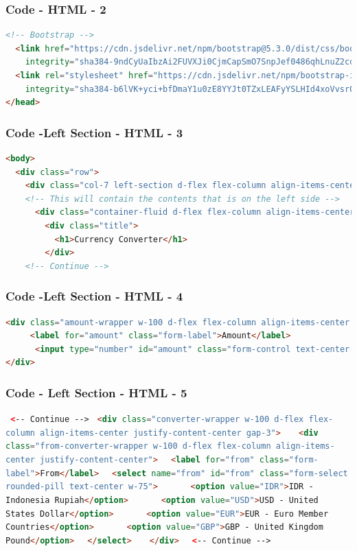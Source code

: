 \documentclass[aspectratio=169, table]{beamer}
\begin{document}
\begin{frame}[fragile]
    \frametitle{Code - HTML - 2}
    \vskip1cm
    \begin{lstlisting}[language=HTML]
  <!-- Bootstrap -->
  <link href="https://cdn.jsdelivr.net/npm/bootstrap@5.3.0/dist/css/bootstrap.min.css" rel="stylesheet"
    integrity="sha384-9ndCyUaIbzAi2FUVXJi0CjmCapSmO7SnpJef0486qhLnuZ2cdeRhO02iuK6FUUVM" crossorigin="anonymous" />
  <link rel="stylesheet" href="https://cdn.jsdelivr.net/npm/bootstrap-icons@1.10.2/font/bootstrap-icons.css"
    integrity="sha384-b6lVK+yci+bfDmaY1u0zE8YYJt0TZxLEAFyYSLHId4xoVvsrQu3INevFKo+Xir8e" crossorigin="anonymous" />
</head>
    \end{lstlisting}
\end{frame}

\begin{frame}[fragile]
    \frametitle{Code -Left Section - HTML - 3}
    \vskip1cm
    \begin{lstlisting}[language=HTML]
<body>
  <div class="row">
    <div class="col-7 left-section d-flex flex-column align-items-center justify-content-center">
	<!-- This will contain the contents that is on the left side -->
      <div class="container-fluid d-flex flex-column align-items-center justify-content-center gap-4">
        <div class="title">
          <h1>Currency Converter</h1>
        </div>
	<!-- Continue -->
    \end{lstlisting}
\end{frame}

\begin{frame}[fragile]
    \frametitle{Code -Left Section - HTML - 4}
    \vskip1cm
    \begin{lstlisting}[language=HTML]
<div class="amount-wrapper w-100 d-flex flex-column align-items-center justify-content-center">
     <label for="amount" class="form-label">Amount</label>
      <input type="number" id="amount" class="form-control text-center rounded-pill w-75" />
</div>
    \end{lstlisting}
\end{frame}

\begin{frame}[fragile]
    \frametitle{Code - Left Section - HTML - 5}
    \vskip1cm
    \lstinline[language=HTML]! <-- Continue --> !
    \lstinline[language=HTML]!<div class="converter-wrapper w-100 d-flex flex-column align-items-center justify-content-center gap-3">!
    \lstinline[language=HTML]!   <div class="from-converter-wrapper w-100 d-flex flex-column align-items-center justify-content-center">!
    \lstinline[language=HTML]!	<label for="from" class="form-label">From</label>!
    \lstinline[language=HTML]!	<select name="from" id="from" class="form-select rounded-pill text-center w-75">!
    \lstinline[language=HTML]!		<option value="IDR">IDR - Indonesia Rupiah</option>!
    \lstinline[language=HTML]!		<option value="USD">USD - United States Dollar</option>!
    \lstinline[language=HTML]!		<option value="EUR">EUR - Euro Member Countries</option>!
    \lstinline[language=HTML]!		<option value="GBP">GBP - United Kingdom Pound</option>!
    \lstinline[language=HTML]!	</select>!
    \lstinline[language=HTML]!   </div>!
    \lstinline[language=HTML]!  <-- Continue --> !
\end{frame}
\end{document}

